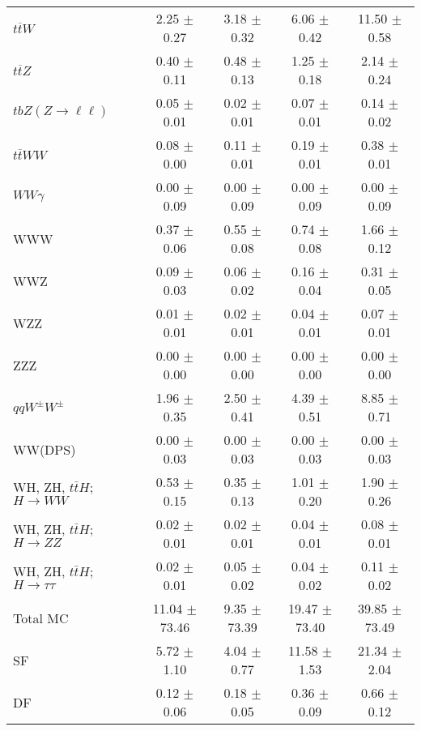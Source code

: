 \begin{tabular}{l|cccc}
                   $t\overline{t}W$ &  2.25 $\pm$  0.27 &  3.18 $\pm$  0.32 &  6.06 $\pm$  0.42 & 11.50 $\pm$  0.58 \\
                   $t\overline{t}Z$ &  0.40 $\pm$  0.11 &  0.48 $\pm$  0.13 &  1.25 $\pm$  0.18 &  2.14 $\pm$  0.24 \\
    $tbZ (Z \rightarrow \ell \ell)$ &  0.05 $\pm$  0.01 &  0.02 $\pm$  0.01 &  0.07 $\pm$  0.01 &  0.14 $\pm$  0.02 \\
                  $t\overline{t}WW$ &  0.08 $\pm$  0.00 &  0.11 $\pm$  0.01 &  0.19 $\pm$  0.01 &  0.38 $\pm$  0.01 \\
                         $WW\gamma$ &  0.00 $\pm$  0.09 &  0.00 $\pm$  0.09 &  0.00 $\pm$  0.09 &  0.00 $\pm$  0.09 \\
                                WWW &  0.37 $\pm$  0.06 &  0.55 $\pm$  0.08 &  0.74 $\pm$  0.08 &  1.66 $\pm$  0.12 \\
                                WWZ &  0.09 $\pm$  0.03 &  0.06 $\pm$  0.02 &  0.16 $\pm$  0.04 &  0.31 $\pm$  0.05 \\
                                WZZ &  0.01 $\pm$  0.01 &  0.02 $\pm$  0.01 &  0.04 $\pm$  0.01 &  0.07 $\pm$  0.01 \\
                                ZZZ &  0.00 $\pm$  0.00 &  0.00 $\pm$  0.00 &  0.00 $\pm$  0.00 &  0.00 $\pm$  0.00 \\
                 $qqW^{\pm}W^{\pm}$ &  1.96 $\pm$  0.35 &  2.50 $\pm$  0.41 &  4.39 $\pm$  0.51 &  8.85 $\pm$  0.71 \\
                            WW(DPS) &  0.00 $\pm$  0.03 &  0.00 $\pm$  0.03 &  0.00 $\pm$  0.03 &  0.00 $\pm$  0.03 \\
WH, ZH, $t\bar{t}H$; $H \rightarrow WW$ &  0.53 $\pm$  0.15 &  0.35 $\pm$  0.13 &  1.01 $\pm$  0.20 &  1.90 $\pm$  0.26 \\
WH, ZH, $t\bar{t}H$; $H \rightarrow ZZ$ &  0.02 $\pm$  0.01 &  0.02 $\pm$  0.01 &  0.04 $\pm$  0.01 &  0.08 $\pm$  0.01 \\
WH, ZH, $t\bar{t}H$; $H \rightarrow \tau\tau$ &  0.02 $\pm$  0.01 &  0.05 $\pm$  0.02 &  0.04 $\pm$  0.02 &  0.11 $\pm$  0.02 \\
\hline\hline
                           Total MC & 11.04 $\pm$ 73.46 &  9.35 $\pm$ 73.39 & 19.47 $\pm$ 73.40 & 39.85 $\pm$ 73.49 \\
\hline
                                 SF &  5.72 $\pm$  1.10 &  4.04 $\pm$  0.77 & 11.58 $\pm$  1.53 & 21.34 $\pm$  2.04 \\
                                 DF &  0.12 $\pm$  0.06 &  0.18 $\pm$  0.05 &  0.36 $\pm$  0.09 &  0.66 $\pm$  0.12 \\

\end{tabular}
